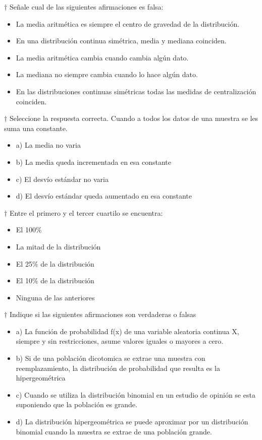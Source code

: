 \documentclass[10pt,a4paper]{article}
\begin{document}
$\dagger$  Señale cual de las siguientes afirmaciones es falsa:
\begin{itemize}
	\item La media aritmética es siempre el centro de gravedad de la distribución.
	\item En una distribución continua simétrica, media y mediana coinciden.
	\item La media aritmética cambia cuando cambia algún dato.
	\item La mediana no siempre cambia cuando lo hace algún dato.
	\item En las distribuciones continuas simétricas todas las medidas de centralización coinciden.
\end{itemize}

$\dagger$   Seleccione la respuesta correcta. Cuando a todos los datos de una muestra se les suma una constante.
\begin{itemize}
	\item a) La media no varia
	\item b) La media queda incrementada en esa constante
	\item c) El desvío estándar no varia
	\item d) El desvío estándar queda aumentado en esa constante
\end{itemize}
\newpage
$\dagger$  Entre el primero y el tercer cuartilo se encuentra:
\begin{itemize}
	\renewcommand{\labelitemi}{\raisebox{-.25\height}{\huge$\square$}}
	\item El 100\%
	\item La mitad de la distribución
	\item El 25\% de la distribución
	\item El 10\% de la distribución
	\item Ninguna de las anteriores 
\end{itemize}

$\dagger$  Indique si las siguientes afirmaciones son verdaderas o falsas
\begin{itemize}
	\item a) La función de probabilidad f(x) de una variable aleatoria continua X, siempre y sin restricciones, asume valores iguales o mayores a cero.
	\item b) Si de una población dicotomica se extrae una muestra con reemplazamiento, la distribución de probabilidad que resulta es la hipergeométrica
	\item c) Cuando se utiliza la distribución binomial en un estudio de opinión se esta suponiendo que la población es grande.
	\item d) La distribución hipergeométrica se puede aproximar por un distribución binomial cuando la muestra se extrae de una población grande.
\end{itemize}
\end{document}
